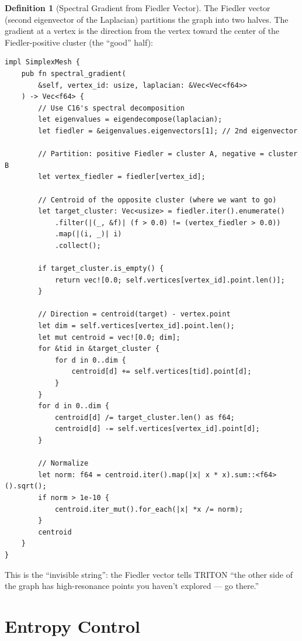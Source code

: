 \documentclass[11pt,a4paper,twoside]{article}
\theoremstyle{definition}
\newtheorem{definition}{Definition}[section]
\theoremstyle{plain}
\theoremstyle{remark}
\begin{document}
\begin{definition}[Spectral Gradient from Fiedler Vector]\label{def:specgrad}
The Fiedler vector (second eigenvector of the Laplacian) partitions
the graph into two halves. The gradient at a vertex is the direction
from the vertex toward the center of the Fiedler-positive cluster
(the ``good'' half):
\begin{lstlisting}
impl SimplexMesh {
    pub fn spectral_gradient(
        &self, vertex_id: usize, laplacian: &Vec<Vec<f64>>
    ) -> Vec<f64> {
        // Use C16's spectral decomposition
        let eigenvalues = eigendecompose(laplacian);
        let fiedler = &eigenvalues.eigenvectors[1]; // 2nd eigenvector

        // Partition: positive Fiedler = cluster A, negative = cluster B
        let vertex_fiedler = fiedler[vertex_id];

        // Centroid of the opposite cluster (where we want to go)
        let target_cluster: Vec<usize> = fiedler.iter().enumerate()
            .filter(|(_, &f)| (f > 0.0) != (vertex_fiedler > 0.0))
            .map(|(i, _)| i)
            .collect();

        if target_cluster.is_empty() {
            return vec![0.0; self.vertices[vertex_id].point.len()];
        }

        // Direction = centroid(target) - vertex.point
        let dim = self.vertices[vertex_id].point.len();
        let mut centroid = vec![0.0; dim];
        for &tid in &target_cluster {
            for d in 0..dim {
                centroid[d] += self.vertices[tid].point[d];
            }
        }
        for d in 0..dim {
            centroid[d] /= target_cluster.len() as f64;
            centroid[d] -= self.vertices[vertex_id].point[d];
        }

        // Normalize
        let norm: f64 = centroid.iter().map(|x| x * x).sum::<f64>().sqrt();
        if norm > 1e-10 {
            centroid.iter_mut().for_each(|x| *x /= norm);
        }
        centroid
    }
}
\end{lstlisting}

This is the ``invisible string'': the Fiedler vector tells TRITON
``the other side of the graph has high-resonance points you haven't
explored --- go there.''
\end{definition}


\section{Entropy Control}\label{sec:entropy}
\end{document}
